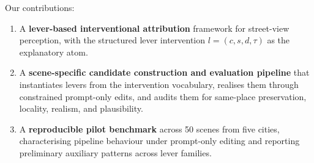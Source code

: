 Our contributions:
\begin{enumerate}
    \item A \textbf{lever-based interventional attribution} framework
    for street-view perception, with the structured lever intervention
    $l=(c,s,d,\tau)$ as the explanatory atom.

    \item A \textbf{scene-specific candidate construction and evaluation
    pipeline} that instantiates levers from the intervention
    vocabulary, realises them through constrained prompt-only edits, and
    audits them for same-place preservation, locality, realism, and
    plausibility.

    \item A \textbf{reproducible pilot benchmark} across 50 scenes from five cities, characterising pipeline behaviour under prompt-only editing and reporting preliminary auxiliary patterns across lever families.
\end{enumerate}